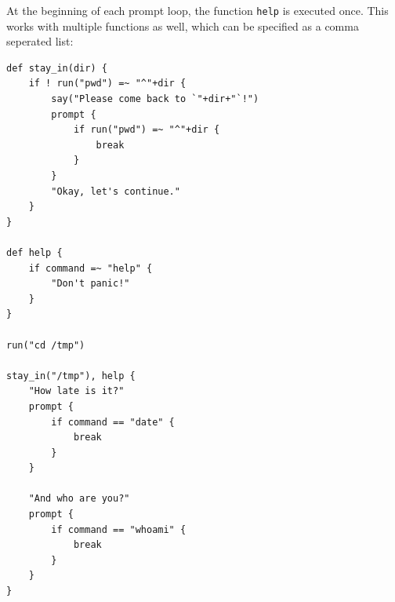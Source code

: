 \documentclass[a4paper,twoside,abstract=on,cleardoublepage=empty,numbers=noenddot,toc=bib]{scrreprt}
\begin{document}
At the beginning of each prompt loop, the function \texttt{help} is executed once. This works with multiple functions as well, which can be specified as a comma seperated list:

\begin{lstlisting}
def stay_in(dir) {
    if ! run("pwd") =~ "^"+dir {
        say("Please come back to `"+dir+"`!")
        prompt {
            if run("pwd") =~ "^"+dir {
                break
            }
        }
        "Okay, let's continue."
    }
}

def help {
    if command =~ "help" {
        "Don't panic!"
    }
}

run("cd /tmp")

stay_in("/tmp"), help {
    "How late is it?"
    prompt {
        if command == "date" {
            break
        }
    }

    "And who are you?"
    prompt {
        if command == "whoami" {
            break
        }
    }
}
\end{lstlisting}
\end{document}
